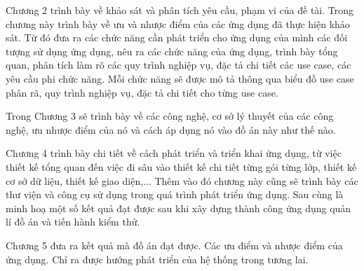 \documentclass[../Main.tex]{subfiles}
\begin{document}
Chương 2 trình bày về khảo sát và phân tích yêu cầu, phạm vi của đề tài. Trong chương này trình bày về ưu và nhược điểm của các ứng dụng đã thực hiện khảo sát. Từ đó đưa ra các chức năng cần phát triển cho ứng dụng của mình các đối tượng sử dụng ứng dụng, nêu ra các chức năng của ứng dụng, trình bày tổng quan, phân tích làm rõ các quy trình nghiệp vụ, đặc tả chi tiết các use case, các yêu cầu phi chức năng. Mỗi chức năng sẽ được mô tả thông qua biểu đồ use case phân rã, quy trình nghiệp vụ, đặc tả chi tiết cho từng use case. 

Trong Chương 3 sẽ trình bày về các công nghệ, cơ sở lý thuyết của các công nghệ, ưu nhược điểm của nó và cách áp dụng nó vào đồ án này như thế nào. 

Chương 4 trình bày chi tiết về cách phát triển và triển khai ứng dụng, từ việc thiết kế tổng quan đến việc đi sâu vào thiết kế chi tiết từng gói từng lớp, thiết kế cơ sở dữ liệu, thiết kế giao diện,... Thêm vào đó chương này cũng sẽ trình bày các thư viện và công cụ sử dụng trong quá trình phát triển ứng dụng. Sau cùng là minh hoạ một số kết quả đạt được sau khi xây dựng thành công ứng dụng quản lí đồ án và tiến hành kiểm thử.

Chương 5 đưa ra kết quả mà đồ án đạt được. Các ưu điểm và nhược điểm của ứng dụng. Chỉ ra được hướng phát triển của hệ thống trong tương lai.
\end{document}
